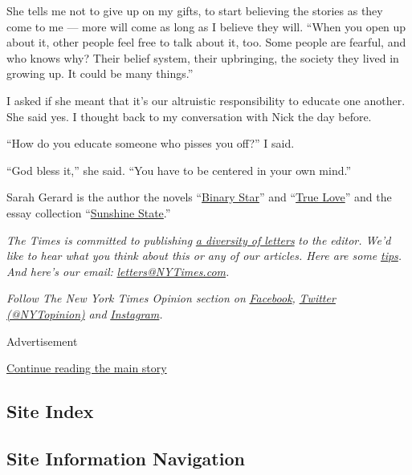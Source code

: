 She tells me not to give up on my gifts, to start believing the stories
as they come to me --- more will come as long as I believe they will.
``When you open up about it, other people feel free to talk about it,
too. Some people are fearful, and who knows why? Their belief system,
their upbringing, the society they lived in growing up. It could be many
things.''

I asked if she meant that it's our altruistic responsibility to educate
one another. She said yes. I thought back to my conversation with Nick
the day before.

``How do you educate someone who pisses you off?'' I said.

``God bless it,'' she said. ``You have to be centered in your own
mind.''

Sarah Gerard is the author the novels
``\href{https://www.twodollarradio.com/products/binary-star}{Binary
Star}'' and
``\href{https://www.harpercollins.com/products/true-love-sarah-gerard}{True
Love}'' and the essay collection
``\href{https://www.harpercollins.com/products/sunshine-state-sarah-gerard}{Sunshine
State}.''

\emph{The Times is committed to publishing}
\href{https://www.nytimes3xbfgragh.onion/2019/01/31/opinion/letters/letters-to-editor-new-york-times-women.html}{\emph{a
diversity of letters}} \emph{to the editor. We'd like to hear what you
think about this or any of our articles. Here are some}
\href{https://help.nytimes3xbfgragh.onion/hc/en-us/articles/115014925288-How-to-submit-a-letter-to-the-editor}{\emph{tips}}\emph{.
And here's our email:}
\href{mailto:letters@NYTimes.com}{\emph{letters@NYTimes.com}}\emph{.}

\emph{Follow The New York Times Opinion section on}
\href{https://www.facebookcorewwwi.onion/nytopinion}{\emph{Facebook}}\emph{,}
\href{http://twitter.com/NYTOpinion}{\emph{Twitter (@NYTopinion)}}
\emph{and}
\href{https://www.instagram.com/nytopinion/}{\emph{Instagram}}\emph{.}

Advertisement

\protect\hyperlink{after-bottom}{Continue reading the main story}

\hypertarget{site-index}{%
\subsection{Site Index}\label{site-index}}

\hypertarget{site-information-navigation}{%
\subsection{Site Information
Navigation}\label{site-information-navigation}}

